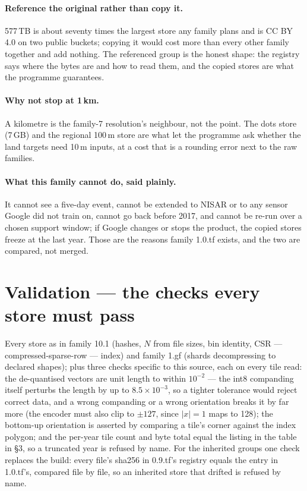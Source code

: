 \documentclass[10pt]{article}
\begin{document}
\paragraph{Reference the original rather than copy it.} 577\,TB is about
seventy times the largest store any family plans and is CC BY 4.0 on two
public buckets;
copying it would cost more than every other family together and add
nothing. The referenced group is the honest shape: the registry says where
the bytes are and how to read them, and the copied stores are what the
programme guarantees.

\paragraph{Why not stop at 1\,km.} A kilometre is the family-7 resolution's
neighbour, not the point. The dots store (7\,GB) and the regional 100\,m
store are what let the programme ask whether the land targets need 10\,m
inputs, at a cost that is a rounding error next to the raw families.

\paragraph{What this family cannot do, said plainly.} It cannot see a
five-day event, cannot be extended to NISAR or to any sensor Google did not
train on, cannot go back before 2017, and cannot be re-run over a chosen
support window; if Google changes or stops the product, the copied stores
freeze at the last year. Those are the reasons family 1.0.tf exists, and
the two are compared, not merged.

\section{Validation --- the checks every store must pass}

Every store as in family 10.1 (hashes, $N$ from file sizes, bin identity,
CSR --- compressed-sparse-row --- index) and family 1.gf (shards decompressing to declared shapes); plus
three checks specific to this source, each on every tile read: the
de-quantised vectors are unit length to within $10^{-2}$ --- the int8
companding itself perturbs the length by up to $8.5 \times 10^{-3}$, so a
tighter tolerance would reject correct data, and a wrong companding or a
wrong orientation breaks it by far more (the encoder must also clip to
$\pm 127$, since $|x| = 1$ maps to 128); the bottom-up
orientation is asserted by comparing a tile's corner against the index
polygon; and the per-year tile count and byte total equal the listing in
the table in \S3, so a truncated year is refused by name. For the inherited groups one check replaces the build: every file's sha256 in 0.9.tf's registry equals the entry in 1.0.tf's, compared file by file, so an inherited store that drifted is refused by name.
\end{document}
